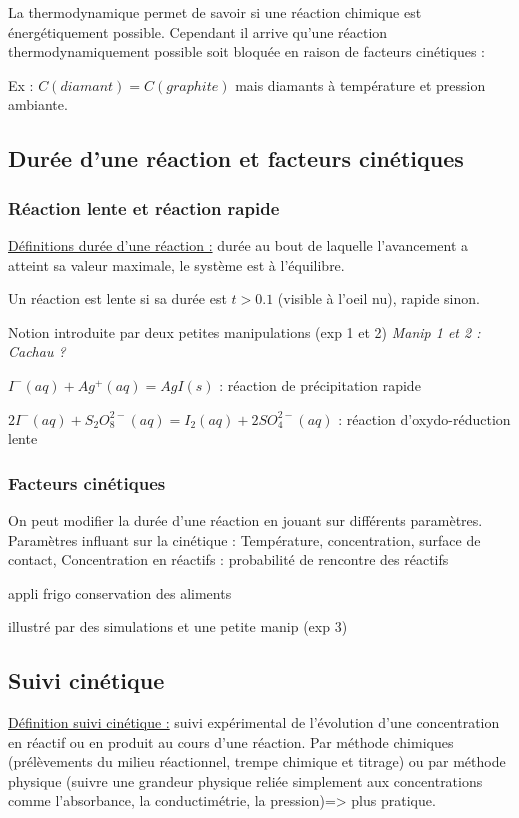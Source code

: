 \documentclass{article}%
\begin{document}
La thermodynamique permet de savoir si une réaction chimique est énergétiquement possible. Cependant il arrive qu'une réaction thermodynamiquement possible soit bloquée en raison de facteurs cinétiques :

Ex : $C(diamant) = C(graphite)$ mais diamants à température et pression ambiante.

\subsection{Durée d'une réaction et facteurs cinétiques}
\subsubsection{Réaction lente et réaction rapide}

\underline{Définitions durée d’une réaction :} durée au bout de laquelle l’avancement a atteint sa valeur maximale, le système est à l’équilibre.

Un réaction est lente si sa durée est $t>0.1$ (visible à l'oeil nu), rapide sinon.

Notion introduite par deux petites manipulations (exp 1 et 2)
\textit{Manip 1 et 2 : Cachau ?}

$I^-(aq)+Ag^+(aq)=AgI(s)$ : réaction de précipitation rapide

$2 I^-(aq) +S_2O_8^{2-}(aq)=I_2(aq)+2 SO_4^{2-}(aq)$ : réaction d'oxydo-réduction lente

\subsubsection{Facteurs cinétiques}

On peut modifier la durée d'une réaction en jouant sur différents paramètres.
Paramètres influant sur la cinétique :
Température, concentration, surface de contact, Concentration en réactifs : probabilité de rencontre des réactifs

appli frigo conservation des aliments

illustré par des simulations et une petite manip (exp 3)

\subsection{Suivi cinétique}

\underline{Définition suivi cinétique :} suivi expérimental de l’évolution d’une concentration en réactif ou en produit
au cours d’une réaction. Par méthode chimiques (prélèvements du milieu réactionnel, trempe chimique et titrage) ou par méthode physique (suivre une grandeur physique reliée simplement aux concentrations comme l’absorbance, la conductimétrie, la pression)=> plus pratique.
\end{document}
